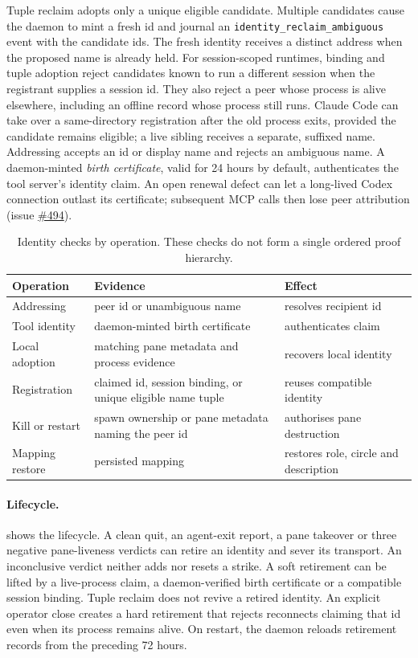 \documentclass[10pt,twocolumn]{article}
\newcommand{\code}[1]{\texttt{#1}}
\begin{document}
Tuple reclaim adopts only a unique eligible candidate. Multiple candidates cause the daemon to mint a fresh id and journal an \code{identity\_reclaim\_ambiguous} event with the candidate ids. The fresh identity receives a distinct address when the proposed name is already held. For session-scoped runtimes, binding and tuple adoption reject candidates known to run a different session when the registrant supplies a session id. They also reject a peer whose process is alive elsewhere, including an offline record whose process still runs. Claude Code can take over a same-directory registration after the old process exits, provided the candidate remains eligible; a live sibling receives a separate, suffixed name. Addressing accepts an id or display name and rejects an ambiguous name. A daemon-minted \emph{birth certificate}, valid for 24 hours by default, authenticates the tool server's identity claim. An open renewal defect can let a long-lived Codex connection outlast its certificate; subsequent MCP calls then lose peer attribution (issue \href{https://github.com/prassanna-ravishankar/repowire/issues/494}{\#494}).

\begin{table}[t]
\caption{Identity checks by operation. These checks do not form a single ordered proof hierarchy.}
\label{tab:proof}
\centering
\footnotesize
\setlength{\tabcolsep}{3pt}\begin{tabular}{@{}p{1.6cm}p{3.1cm}p{2.5cm}@{}}
\toprule
Operation & Evidence & Effect \\
\midrule
Addressing & peer id or unambiguous name & resolves recipient id \\
Tool identity & daemon-minted birth certificate & authenticates claim \\
Local adoption & matching pane metadata and process evidence & recovers local identity \\
Registration & claimed id, session binding, or unique eligible name tuple & reuses compatible identity \\
Kill or restart & spawn ownership or pane metadata naming the peer id & authorises pane destruction \\
Mapping restore & persisted mapping & restores role, circle and description \\
\bottomrule
\end{tabular}
\end{table}

\paragraph{Lifecycle.}
 shows the lifecycle. A clean quit, an agent-exit report, a pane takeover or three negative pane-liveness verdicts can retire an identity and sever its transport. An inconclusive verdict neither adds nor resets a strike. A soft retirement can be lifted by a live-process claim, a daemon-verified birth certificate or a compatible session binding. Tuple reclaim does not revive a retired identity. An explicit operator close creates a hard retirement that rejects reconnects claiming that id even when its process remains alive. On restart, the daemon reloads retirement records from the preceding 72 hours.
\end{document}
